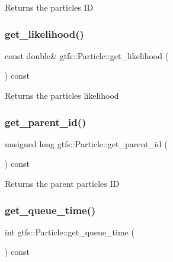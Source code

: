 \begin{DoxyReturn}{Returns}
the particle\textquotesingle{}s ID 
\end{DoxyReturn}
\mbox{\label{classgtfs_1_1Particle_a2e1a6de0b7d0fd6938ef3f7f9e5d4b99}} 
\subsubsection{\texorpdfstring{get\+\_\+likelihood()}{get\_likelihood()}}
{\footnotesize\ttfamily const double\& gtfs\+::\+Particle\+::get\+\_\+likelihood (\begin{DoxyParamCaption}{ }\end{DoxyParamCaption}) const\hspace{0.3cm}{\ttfamily [inline]}}

\begin{DoxyReturn}{Returns}
the particle\textquotesingle{}s likelihood 
\end{DoxyReturn}
\mbox{\label{classgtfs_1_1Particle_a9372dbbfe702b9931b9eb1ee217afcba}} 
\subsubsection{\texorpdfstring{get\+\_\+parent\+\_\+id()}{get\_parent\_id()}}
{\footnotesize\ttfamily unsigned long gtfs\+::\+Particle\+::get\+\_\+parent\+\_\+id (\begin{DoxyParamCaption}{ }\end{DoxyParamCaption}) const}

\begin{DoxyReturn}{Returns}
the parent particle\textquotesingle{}s ID 
\end{DoxyReturn}
\mbox{\label{classgtfs_1_1Particle_a63bd83f650af8855f014e6e5f86a123a}} 
\subsubsection{\texorpdfstring{get\+\_\+queue\+\_\+time()}{get\_queue\_time()}}
{\footnotesize\ttfamily int gtfs\+::\+Particle\+::get\+\_\+queue\+\_\+time (\begin{DoxyParamCaption}{ }\end{DoxyParamCaption}) const\hspace{0.3cm}{\ttfamily [inline]}}

